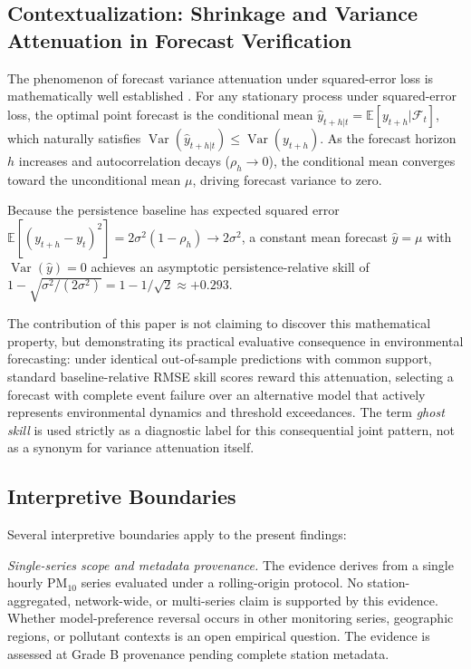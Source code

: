 \documentclass[12pt]{article}
\begin{document}
\subsection{Contextualization: Shrinkage and Variance Attenuation in Forecast Verification}
\label{sec:disc_shrinkage}

The phenomenon of forecast variance attenuation under squared-error loss is mathematically well established \citep{murphy1988,gneiting2011,taylor2001}. For any stationary process under squared-error loss, the optimal point forecast is the conditional mean $\hat{y}_{t+h|t} = \mathbb{E}[y_{t+h}|\mathcal{F}_t]$, which naturally satisfies $\operatorname{Var}(\hat{y}_{t+h|t}) \le \operatorname{Var}(y_{t+h})$. As the forecast horizon $h$ increases and autocorrelation decays ($\rho_h \to 0$), the conditional mean converges toward the unconditional mean $\mu$, driving forecast variance to zero. 

Because the persistence baseline has expected squared error $\mathbb{E}[(y_{t+h} - y_t)^2] = 2\sigma^2(1 - \rho_h) \to 2\sigma^2$, a constant mean forecast $\hat{y} = \mu$ with $\operatorname{Var}(\hat{y}) = 0$ achieves an asymptotic persistence-relative skill of $1 - \sqrt{\sigma^2 / (2\sigma^2)} = 1 - 1/\sqrt{2} \approx +0.293$. 

The contribution of this paper is not claiming to discover this mathematical property, but demonstrating its practical evaluative consequence in environmental forecasting: under identical out-of-sample predictions with common support, standard baseline-relative RMSE skill scores reward this attenuation, selecting a forecast with complete event failure over an alternative model that actively represents environmental dynamics and threshold exceedances. The term \emph{ghost skill} is used strictly as a diagnostic label for this consequential joint pattern, not as a synonym for variance attenuation itself.

\subsection{Interpretive Boundaries}
\label{sec:disc_boundaries}

Several interpretive boundaries apply to the present findings:

\emph{Single-series scope and metadata provenance.}
The evidence derives from a single hourly $\mathrm{PM}_{10}$ series evaluated under a rolling-origin protocol. No station-aggregated, network-wide, or multi-series claim is supported by this evidence. Whether model-preference reversal occurs in other monitoring series, geographic regions, or pollutant contexts is an open empirical question. The evidence is assessed at Grade B provenance pending complete station metadata.
\end{document}

